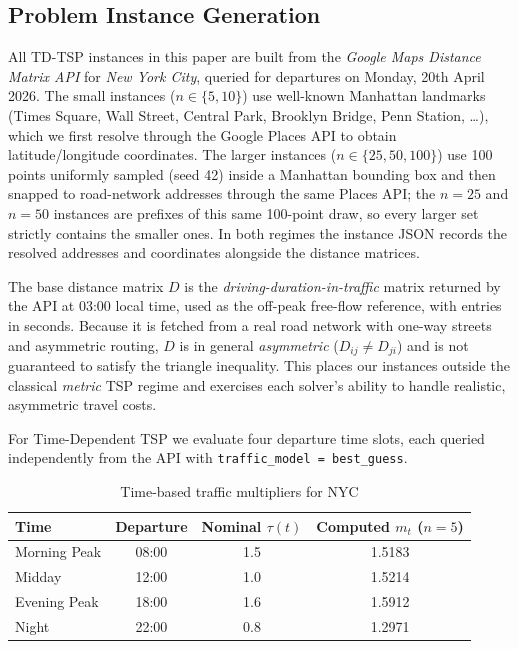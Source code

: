 \documentclass[conference]{IEEEtran}
\begin{document}
\subsection{Problem Instance Generation}

All TD-TSP instances in this paper are built from the \emph{Google Maps Distance Matrix API} for \emph{New York City}, queried for departures on Monday, 20th April 2026. The small instances ($n \in \{5, 10\}$) use well-known Manhattan landmarks (Times Square, Wall Street, Central Park, Brooklyn Bridge, Penn Station, \ldots), which we first resolve through the Google Places API to obtain latitude/longitude coordinates. The larger instances ($n \in \{25, 50, 100\}$) use 100 points uniformly sampled (seed 42) inside a Manhattan bounding box and then snapped to road-network addresses through the same Places API; the $n=25$ and $n=50$ instances are prefixes of this same 100-point draw, so every larger set strictly contains the smaller ones. In both regimes the instance JSON records the resolved addresses and coordinates alongside the distance matrices.

The base distance matrix $D$ is the \emph{driving-duration-in-traffic} matrix returned by the API at 03:00 local time, used as the off-peak free-flow reference, with entries in seconds. Because it is fetched from a real road network with one-way streets and asymmetric routing, $D$ is in general \emph{asymmetric} ($D_{ij} \ne D_{ji}$) and is not guaranteed to satisfy the triangle inequality. This places our instances outside the classical \emph{metric} TSP regime and exercises each solver's ability to handle realistic, asymmetric travel costs.

For Time-Dependent TSP we evaluate four departure time slots, each queried independently from the API with \texttt{traffic\_model = best\_guess}.

\begin{table}[htbp]
\caption{Time-based traffic multipliers for NYC}
\begin{center}
\begin{tabular}{|l|c|c|c|}
\hline
\textbf{Time} & \textbf{Departure} & \textbf{Nominal $\tau(t)$} & \textbf{Computed $m_t$ ($n{=}5$)} \\
\hline
Morning Peak & 08:00 & 1.5 & 1.5183 \\
\hline
Midday       & 12:00 & 1.0 & 1.5214 \\
\hline
Evening Peak & 18:00 & 1.6 & 1.5912 \\
\hline
Night        & 22:00 & 0.8 & 1.2971 \\
\hline
\end{tabular}
\label{tab:slots}
\end{center}
\end{table}
\end{document}
